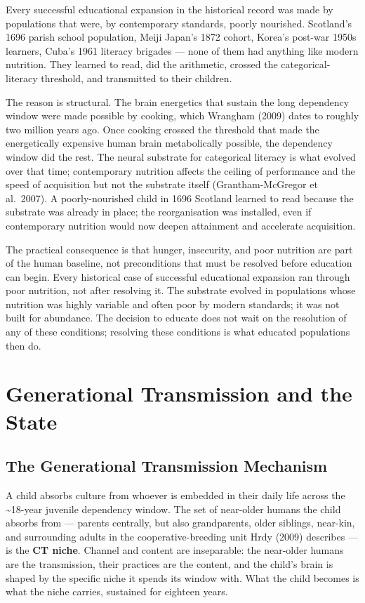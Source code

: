 \documentclass[12pt,letterpaper]{article}
\begin{document}
Every successful educational expansion in the historical record was
made by populations that were, by contemporary standards, poorly
nourished. Scotland's 1696 parish school population, Meiji Japan's
1872 cohort, Korea's post-war 1950s learners, Cuba's 1961 literacy
brigades --- none of them had anything like modern nutrition. They
learned to read, did the arithmetic, crossed the categorical-literacy
threshold, and transmitted to their children.

The reason is structural. The brain energetics that sustain the long
dependency window were made possible by cooking, which Wrangham
(2009) dates to roughly two million years ago. Once cooking crossed
the threshold that made the energetically expensive human brain
metabolically possible, the dependency window did the rest. The
neural substrate for categorical literacy is what evolved over that
time; contemporary nutrition affects the ceiling of performance and
the speed of acquisition but not the substrate itself
(Grantham-McGregor et al.\ 2007). A poorly-nourished child in 1696
Scotland learned to read because the substrate was already in place;
the reorganisation was installed, even if contemporary nutrition
would now deepen attainment and accelerate acquisition.

The practical consequence is that hunger, insecurity, and poor
nutrition are part of the human baseline, not preconditions that
must be resolved before education can begin. Every historical case of
successful educational expansion ran through poor nutrition, not
after resolving it. The substrate evolved in populations whose
nutrition was highly variable and often poor by modern standards;
it was not built for abundance. The decision to educate does not wait
on the resolution of any of these conditions; resolving these
conditions is what educated populations then do.

\section{Generational Transmission and the State}\label{generational-transmission-and-state}

\subsection{The Generational Transmission Mechanism}\label{the-generational-transmission-mechanism}

A child absorbs culture from whoever is embedded in their daily life
across the \textasciitilde 18-year juvenile dependency window. The set
of near-older humans the child absorbs from --- parents centrally, but
also grandparents, older siblings, near-kin, and surrounding adults
in the cooperative-breeding unit Hrdy (2009) describes --- is the
\textbf{CT niche}. Channel and content are inseparable: the near-older
humans are the transmission, their practices are the content, and the
child's brain is shaped by the specific niche it spends its window
with. What the child becomes is what the niche carries, sustained for
eighteen years.
\end{document}
